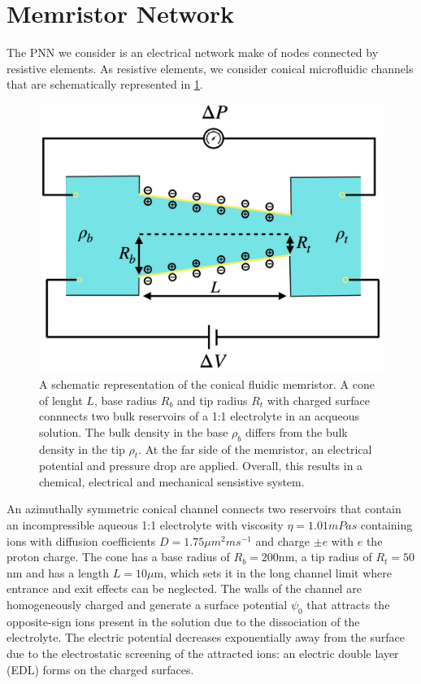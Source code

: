 \documentclass[reprint,superscriptaddress,prb,showkeys]{revtex4-2}
\begin{document}
\newpage

\section{\label{sec:memristor_network}Memristor Network}

The PNN we consider is an electrical network make of nodes connected by resistive elements. As resistive elements, we consider conical microfluidic channels that are schematically represented in \cref{fig:memristor_scheme}. 
\begin{figure}[h]
    \centering
    \includegraphics[width=\columnwidth]{plots/memristor/memristor_scheme.pdf}
    \caption{A schematic representation of the conical fluidic memristor. A cone of lenght $L$, base radius $R_b$ and tip radius $R_t$ with charged surface connnects two bulk reservoirs of a 1:1 electrolyte in an acqueous solution. The bulk density in the base $\rho_b$ differs from the bulk density in the tip $\rho_t$. At the far side of the memristor, an electrical potential and pressure drop are applied. Overall, this results in a chemical, electrical and mechanical sensistive system.}\label{fig:memristor_scheme}
\end{figure} 
An azimuthally symmetric conical channel connects two reservoirs that contain an incompressible aqueous 1:1 electrolyte with viscosity $\eta=1.01mPa s$ containing ions with diffusion coefficients $D = 1.75\mu m^2 ms^{-1}$ and charge $\pm e$ with $e$ the proton charge. The cone has a base radius of $R_b = 200$nm, a tip radius of $R_t=50$nm and has a length $L = 10\mu$m, which sets it in the long channel limit where entrance and exit effects can be neglected. The walls of the channel are homogeneously charged and generate a surface potential $\psi_0$ that attracts the opposite-sign ions present in the solution due to the dissociation of the electrolyte. The electric potential decreases exponentially away from the surface due to the electrostatic screening of the attracted ions: an electric double layer (EDL) forms on the charged surfaces. 
\end{document}
